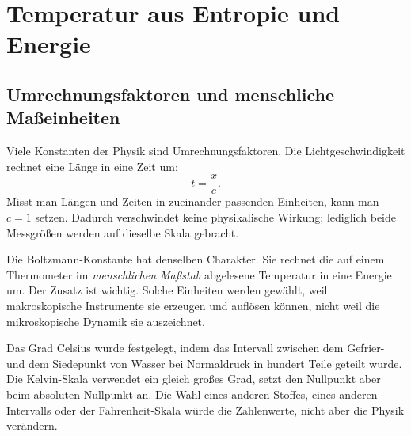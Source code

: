 \chapter{Temperatur aus Entropie und Energie}


\section{Umrechnungsfaktoren und menschliche Maßeinheiten}

Viele Konstanten der Physik sind Umrechnungsfaktoren. Die Lichtgeschwindigkeit rechnet eine Länge in eine Zeit um:
\begin{equation}
 t=\frac{x}{c}.
\end{equation}
Misst man Längen und Zeiten in zueinander passenden Einheiten, kann man \(c=1\) setzen. Dadurch verschwindet keine physikalische Wirkung; lediglich beide Messgrößen werden auf dieselbe Skala gebracht.

Die Boltzmann-Konstante hat denselben Charakter. Sie rechnet die auf einem Thermometer im \emph{menschlichen Maßstab} abgelesene Temperatur in eine Energie um. Der Zusatz ist wichtig. Solche Einheiten werden gewählt, weil makroskopische Instrumente sie erzeugen und auflösen können, nicht weil die mikroskopische Dynamik sie auszeichnet.

Das Grad Celsius wurde festgelegt, indem das Intervall zwischen dem Gefrier- und dem Siedepunkt von Wasser bei Normaldruck in hundert Teile geteilt wurde. Die Kelvin-Skala verwendet ein gleich großes Grad, setzt den Nullpunkt aber beim absoluten Nullpunkt an. Die Wahl eines anderen Stoffes, eines anderen Intervalls oder der Fahrenheit-Skala würde die Zahlenwerte, nicht aber die Physik verändern.

\begin{classroomqa}
\end{classroomqa}

